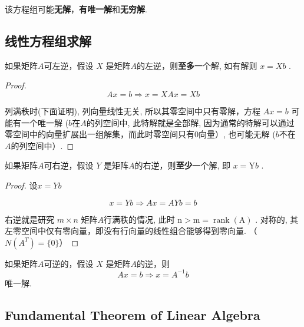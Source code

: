 该方程组可能\textbf{无解}，\textbf{有唯一解}和\textbf{无穷解}.

\subsection{线性方程组求解}

\begin{theorem}
    如果矩阵$A$可左逆，假设 $ X $ 是矩阵$A$的左逆，则\textbf{至多}一个解, 如有解则 $ x=X b $ . 
\end{theorem}

\begin{proof}
    $$
A x=b \Rightarrow  x=X A x=X b
$$

    列满秩时(下面证明), 列向量线性无关, 所以其零空间中只有零解，方程 $ {Ax}={b} $ 可能有一个唯一解 ($b$在$A$的列空间中, 此特解就是全部解, 因为通常的特解可以通过零空间中的向量扩展出一组解集，而此时零空间只有$0$向量）, 也可能无解 ($b$不在$A$的列空间中）. 
\end{proof}

\begin{theorem}
    如果矩阵$A$可右逆，假设 $ Y $ 是矩阵$A$的右逆，则\textbf{至少}一个解, 即 $ x=\mathrm{Y} b $ . 
\end{theorem}

\begin{proof}
    设$x=Y b$ 

    $$
x=Y b  \Rightarrow  A x=A Y b=b
$$


右逆就是研究 $m \times n $ 矩阵$A$行满秩的情况, 此时 $ \mathrm{n}>\mathrm{m}=\operatorname{rank}(\mathrm{A}) $ . 对称的, 其左零空间中仅有零向量，即没有行向量的线性组合能够得到零向量. （$N(A ^T ) = \{0\}$）
\end{proof}

\begin{theorem}
    如果矩阵$A$可逆的，假设 $ X $ 是矩阵$A$的逆，则
$$
A x=b  \Rightarrow  x=A^{-1} b
$$
唯一解. 
\end{theorem}

\subsection{Fundamental Theorem of Linear Algebra}


